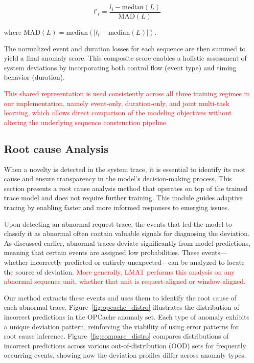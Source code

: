 \documentclass[preprint,12pt]{elsarticle}
\begin{document}
\begin{equation}\label{eqfracequation}
l'_i = \frac{l_i - \text{median}(L)}{\text{MAD}(L)}
\end{equation}

where $\text{MAD}(L) = \text{median} ( | l_i - \text{median}(L) | )$.

The normalized event and duration losses for each sequence are then summed to yield a final anomaly score. This composite score enables a holistic assessment of system deviations by incorporating both control flow (event type) and timing behavior (duration).

\textcolor{red}{This shared representation is used consistently across all three training regimes in our implementation, namely event-only, duration-only, and joint multi-task learning, which allows direct comparison of the modeling objectives without altering the underlying sequence construction pipeline.}


\subsection{Root cause Analysis}
When a novelty is detected in the system trace, it is essential to identify its root cause and ensure transparency in the model’s decision-making process. This section presents a root cause analysis method that operates on top of the trained trace model and does not require further training. This module guides adaptive tracing by enabling faster and more informed responses to emerging issues.

Upon detecting an abnormal request trace, the events that led the model to classify it as abnormal often contain valuable signals for diagnosing the deviation. As discussed earlier, abnormal traces deviate significantly from model predictions, meaning that certain events are assigned low probabilities. These events—whether incorrectly predicted or entirely unexpected—can be analyzed to locate the source of deviation. \textcolor{red}{More generally, LMAT performs this analysis on any abnormal sequence unit, whether that unit is request-aligned or window-aligned.}

Our method extracts these events and uses them to identify the root cause of each abnormal trace. Figure~\ref{fig:opcache_distro} illustrates the distribution of incorrect predictions in the OPCache anomaly set. Each type of anomaly exhibits a unique deviation pattern, reinforcing the viability of using error patterns for root cause inference. Figure~\ref{fig:compare_distro} compares distributions of incorrect predictions across various out-of-distribution (OOD) sets for frequently occurring events, showing how the deviation profiles differ across anomaly types.
\end{document}
